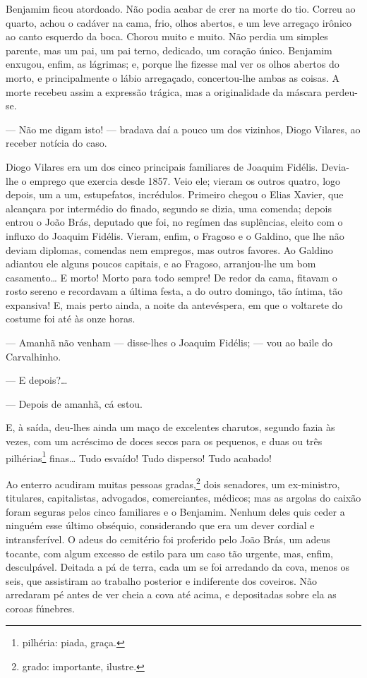 Benjamim ficou atordoado. Não podia acabar de crer na morte do tio.
Correu ao quarto, achou o cadáver na cama, frio, olhos abertos, e um
leve arregaço irônico ao canto esquerdo da boca. Chorou muito e muito.
Não perdia um simples parente, mas um pai, um pai terno, dedicado, um
coração único. Benjamim enxugou, enfim, as lágrimas; e, porque lhe
fizesse mal ver os olhos abertos do morto, e principalmente o lábio
arregaçado, concertou-lhe ambas as coisas. A morte recebeu assim a
expressão trágica, mas a originalidade da máscara perdeu-se.

--- Não me digam isto! --- bradava daí a pouco um dos vizinhos, Diogo
Vilares, ao receber notícia do caso.

Diogo Vilares era um dos cinco principais familiares de Joaquim Fidélis.
Devia-lhe o emprego que exercia desde 1857. Veio ele; vieram os outros
quatro, logo depois, um a um, estupefatos, incrédulos. Primeiro chegou o
Elias Xavier, que alcançara por intermédio do finado, segundo se dizia,
uma comenda; depois entrou o João Brás, deputado que foi, no regímen das
suplências, eleito com o influxo do Joaquim Fidélis. Vieram, enfim, o
Fragoso e o Galdino, que lhe não deviam diplomas, comendas nem empregos,
mas outros favores. Ao Galdino adiantou ele alguns poucos capitais, e ao
Fragoso, arranjou-lhe um bom casamento\ldots{} E morto! Morto para todo
sempre! De redor da cama, fitavam o rosto sereno e recordavam a última
festa, a do outro domingo, tão íntima, tão expansiva! E, mais perto
ainda, a noite da antevéspera, em que o voltarete do costume foi até às
onze horas.

--- Amanhã não venham --- disse-lhes o Joaquim Fidélis; --- vou ao baile
do Carvalhinho.

--- E depois?\ldots{}

--- Depois de amanhã, cá estou.

E, à saída, deu-lhes ainda um maço de excelentes charutos, segundo fazia
às vezes, com um acréscimo de doces secos para os pequenos, e duas ou
três pilhérias\footnote{pilhéria: piada, graça.} finas\ldots{} Tudo esvaído!
Tudo disperso! Tudo acabado!

Ao enterro acudiram muitas pessoas gradas,\footnote{grado: importante,
  ilustre.} dois senadores, um ex-ministro, titulares, capitalistas,
advogados, comerciantes, médicos; mas as argolas do caixão foram seguras
pelos cinco familiares e o Benjamim. Nenhum deles quis ceder a ninguém
esse último obséquio, considerando que era um dever cordial e
intransferível. O adeus do cemitério foi proferido pelo João Brás, um
adeus tocante, com algum excesso de estilo para um caso tão urgente,
mas, enfim, desculpável. Deitada a pá de terra, cada um se foi arredando
da cova, menos os seis, que assistiram ao trabalho posterior e
indiferente dos coveiros. Não arredaram pé antes de ver cheia a cova até
acima, e depositadas sobre ela as coroas fúnebres.


